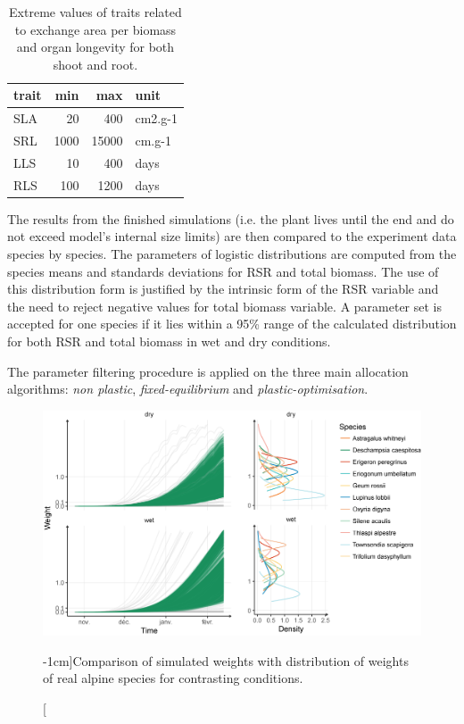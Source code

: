 \begin{table}[]
\centering
\caption{Extreme values of traits related to exchange area per biomass and organ longevity for both shoot and root.}
\label{table:boundaries}
\begin{tabular}{lrrl}
trait & min  & max   & unit    \\ \hline
SLA   & 20   & 400   & cm2.g-1 \\
SRL   & 1000 & 15000 & cm.g-1  \\
LLS   & 10   & 400   & days    \\
RLS   & 100  & 1200  & days   
\end{tabular}
\end{table}


The results from the finished simulations (i.e. the plant lives until the end and do not exceed model's internal size limits) are then compared to the experiment data species by species. The parameters of logistic distributions are computed from the species means and standards deviations for RSR and total biomass. The use of this distribution form is justified by the intrinsic form of the RSR variable and the need to reject negative values for total biomass variable. A parameter set is accepted for one species if it lies within a 95\% range of the calculated distribution for both RSR and total biomass in wet and dry conditions.

The parameter filtering procedure is applied on the three main allocation algorithms: \textit{non plastic}, \textit{fixed-equilibrium} and \textit{plastic-optimisation}.

\begin{figure}\label{fig:comparison_BM}
\includegraphics[width = \textwidth]{./2_PP/Figures/Calibration/weight_full_sim.png}
\caption[][-1cm]{Comparison of simulated weights with distribution of weights of real alpine species for contrasting conditions.}
\end{figure}

